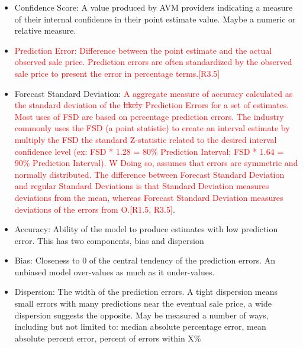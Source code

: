 \documentclass[colTwo]{anon}
\theoremstyle{definition}
\begin{document}
\begin{itemize}
\item Confidence Score: A value produced by AVM providers indicating a measure of their internal confidence in their point estimate value.  Maybe a numeric or relative measure. 
\item \textcolor{red}{Prediction Error: Difference between the point estimate and the actual observed sale price. Prediction errors are often standardized by the observed sale price to present the error in percentage terms.[R3.5]}
\item Forecast Standard Deviation:  \textcolor{red}{A aggregate measure of accuracy calculated as the standard deviation of the \st{likely} Prediction Errors for a set of estimates. Most uses of FSD are based on percentage prediction errors. The industry commonly uses the FSD (a point statistic) to create an interval estimate by multiply the FSD the standard Z-statistic related to the desired interval confidence level (ex: FSD * 1.28 = 80\% Prediction Interval; FSD * 1.64 = 90\% Prediction Interval). W Doing so, assumes that errors are symmetric and normally distributed. The difference between Forecast Standard Deviation and regular Standard Deviations is that Standard Deviation measures deviations from the mean, whereas Forecast Standard Deviation measures deviations of the errors from O.[R1.5, R3.5]}.

\item Accuracy: Ability of the model to produce estimates with low prediction error.  This has two components, bias and dispersion
\item Bias: Closeness to 0 of the central tendency of the prediction errors.  An unbiased model over-values as much as it under-values.  
\item Dispersion: The width of the prediction errors.  A tight dispersion means small errors with many predictions near the eventual sale price, a wide dispersion suggests the opposite.  May be measured a number of ways, including but not limited to: median absolute percentage error, mean absolute percent error, percent of errors within X\%
\end{itemize}
\end{document}
